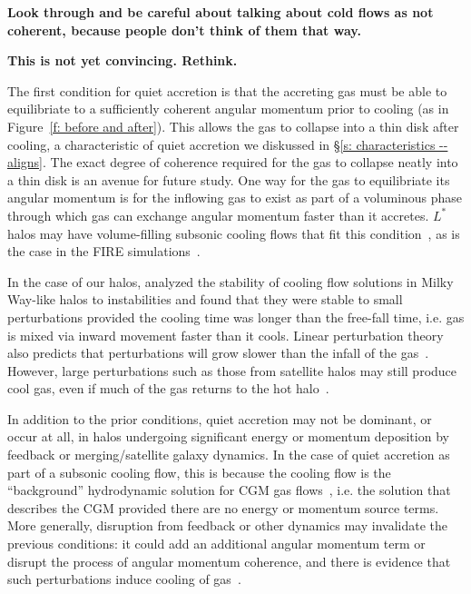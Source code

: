 \documentclass[fleqn,usenatbib]{mnras}
\begin{document}
\textbf{Look through and be careful about talking about cold flows as not coherent, because people don't think of them that way.}

\textbf{This is not yet convincing. Rethink.}

The first condition for quiet accretion is that the accreting gas must be able to equilibriate to a sufficiently coherent angular momentum prior to cooling (as in Figure~\ref{f: before and after}).
This allows the gas to collapse into a thin disk after cooling, a characteristic of quiet accretion we diskussed in \S\ref{s: characteristics -- aligns}.
The exact degree of coherence required for the gas to collapse neatly into a thin disk is an avenue for future study.
One way for the gas to equilibriate its angular momentum is for the inflowing gas to exist as part of a voluminous phase through which gas can exchange angular momentum faster than it accretes.
$L^*$ halos may have volume-filling subsonic cooling flows that fit this condition~\citep{Stern2019}, as is the case in the FIRE simulations~\citep{Stern2020a}.

In the case of our halos, \cite{Stern2019} analyzed the stability of cooling flow solutions in Milky Way-like halos to instabilities and found that they were stable to small perturbations provided the cooling time was longer than the free-fall time, i.e. gas is mixed via inward movement faster than it cools.
Linear perturbation theory also predicts that perturbations will grow slower than the infall of the gas~\citep[e.g.][]{Balbus1989}.
However, large perturbations such as those from satellite halos may still produce cool gas, even if much of the gas returns to the hot halo~\citep{Esmerian2020}.

In addition to the prior conditions, quiet accretion may not be dominant, or occur at all, in halos undergoing significant energy or momentum deposition by feedback or merging/satellite galaxy dynamics.
In the case of quiet accretion as part of a subsonic cooling flow, this is because the cooling flow is the ``background'' hydrodynamic solution for CGM gas flows~\cite{Stern2019}, i.e. the solution that describes the CGM provided there are no energy or momentum source terms.
More generally, disruption from feedback or other dynamics may invalidate the previous conditions: it could add an additional angular momentum term or disrupt the process of angular momentum coherence, and there is evidence that such perturbations induce cooling of gas~\citep[e.g.][]{Hummels2019, Esmerian2020}.
\end{document}
